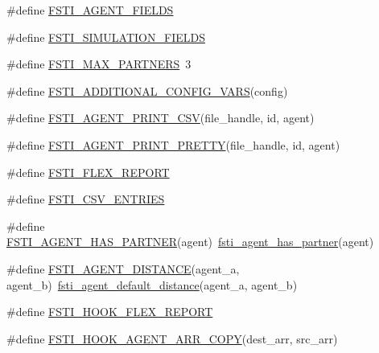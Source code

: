 \begin{DoxyCompactItemize}
\item 
\#define \mbox{\hyperlink{fsti-defaults_8h_ae8d43f5c182bec36fb3c3d06e72c6e3a}{F\+S\+T\+I\+\_\+\+A\+G\+E\+N\+T\+\_\+\+F\+I\+E\+L\+DS}}
\item 
\#define \mbox{\hyperlink{fsti-defaults_8h_aaece3a015f9dfc102b4c62343cb24aef}{F\+S\+T\+I\+\_\+\+S\+I\+M\+U\+L\+A\+T\+I\+O\+N\+\_\+\+F\+I\+E\+L\+DS}}
\item 
\#define \mbox{\hyperlink{fsti-defaults_8h_a63eab3d9e5c24ef228101d5acabc8220}{F\+S\+T\+I\+\_\+\+M\+A\+X\+\_\+\+P\+A\+R\+T\+N\+E\+RS}}~3
\item 
\#define \mbox{\hyperlink{fsti-defaults_8h_afddc44c41cd9a27367b2e0b713a8d8db}{F\+S\+T\+I\+\_\+\+A\+D\+D\+I\+T\+I\+O\+N\+A\+L\+\_\+\+C\+O\+N\+F\+I\+G\+\_\+\+V\+A\+RS}}(config)
\item 
\#define \mbox{\hyperlink{fsti-defaults_8h_ae9615756f2e94085e1246bcdf2f47633}{F\+S\+T\+I\+\_\+\+A\+G\+E\+N\+T\+\_\+\+P\+R\+I\+N\+T\+\_\+\+C\+SV}}(file\+\_\+handle,  id,  agent)
\item 
\#define \mbox{\hyperlink{fsti-defaults_8h_af542dd893b712cd81a7cd58113daf26f}{F\+S\+T\+I\+\_\+\+A\+G\+E\+N\+T\+\_\+\+P\+R\+I\+N\+T\+\_\+\+P\+R\+E\+T\+TY}}(file\+\_\+handle,  id,  agent)
\item 
\#define \mbox{\hyperlink{fsti-defaults_8h_a36529309a147495750fc57470a781acf}{F\+S\+T\+I\+\_\+\+F\+L\+E\+X\+\_\+\+R\+E\+P\+O\+RT}}
\item 
\#define \mbox{\hyperlink{fsti-defaults_8h_af8002fd5fc80bf52218b8b590a284c53}{F\+S\+T\+I\+\_\+\+C\+S\+V\+\_\+\+E\+N\+T\+R\+I\+ES}}
\item 
\#define \mbox{\hyperlink{fsti-defaults_8h_a4e2befc284c33dd74c9d9947f9eaf899}{F\+S\+T\+I\+\_\+\+A\+G\+E\+N\+T\+\_\+\+H\+A\+S\+\_\+\+P\+A\+R\+T\+N\+ER}}(agent)~\mbox{\hyperlink{fsti-agent_8h_ae4a719a71a7f8a2687d05976340b1ffb}{fsti\+\_\+agent\+\_\+has\+\_\+partner}}(agent)
\item 
\#define \mbox{\hyperlink{fsti-defaults_8h_a89dc08f474071d0d1e96eeb185b69bec}{F\+S\+T\+I\+\_\+\+A\+G\+E\+N\+T\+\_\+\+D\+I\+S\+T\+A\+N\+CE}}(agent\+\_\+a,  agent\+\_\+b)~\mbox{\hyperlink{fsti-agent_8h_a0624a840237ec82520be71b241220226}{fsti\+\_\+agent\+\_\+default\+\_\+distance}}(agent\+\_\+a, agent\+\_\+b)
\item 
\#define \mbox{\hyperlink{fsti-defaults_8h_a5332f6a4a3474ddbfc73380a470713fc}{F\+S\+T\+I\+\_\+\+H\+O\+O\+K\+\_\+\+F\+L\+E\+X\+\_\+\+R\+E\+P\+O\+RT}}
\item 
\#define \mbox{\hyperlink{fsti-defaults_8h_ad93324b43e43bc3e93c1689c5cf5fdb6}{F\+S\+T\+I\+\_\+\+H\+O\+O\+K\+\_\+\+A\+G\+E\+N\+T\+\_\+\+A\+R\+R\+\_\+\+C\+O\+PY}}(dest\+\_\+arr,  src\+\_\+arr)

\end{DoxyCompactItemize}
